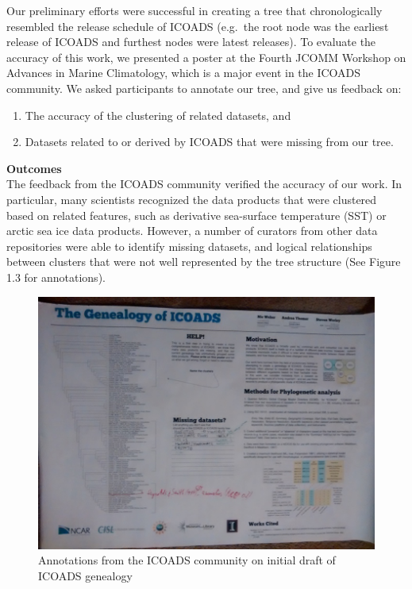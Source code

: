 \documentclass[thesis,tocnosub,noragright,centerchapter,12pt]{uiucecethesis09}
\begin{document}
Our preliminary efforts were successful in creating a tree that
chronologically resembled the release schedule of ICOADS (e.g.~the root
node was the earliest release of ICOADS and furthest nodes were latest
releases). To evaluate the accuracy of this work, we presented a poster
at the Fourth JCOMM Workshop on Advances in Marine Climatology, which is
a major event in the ICOADS community. We asked participants to annotate
our tree, and give us feedback on:\\

\begin{enumerate}
\def\labelenumi{\arabic{enumi}.}
\itemsep1pt\parskip0pt
\item
  The accuracy of the clustering of related datasets, and
\item
  Datasets related to or derived by ICOADS that were missing from our
  tree.
\end{enumerate}

\textbf{Outcomes}\\ 
The feedback from the ICOADS community verified the
accuracy of our work. In particular, many scientists recognized the data
products that were clustered based on related features, such as
derivative sea-surface temperature (SST) or arctic sea ice data
products. However, a number of curators from other data repositories were able to identify missing datasets, and logical  relationships between clusters that were not well represented by the tree structure (See Figure 1.3 for annotations).\\

\begin{figure}
\centering
\includegraphics[width=\textwidth]{gen}
\caption{Annotations from the ICOADS community on initial draft of ICOADS genealogy}
\label{fig:my_label}
\end{figure}
\end{document}
